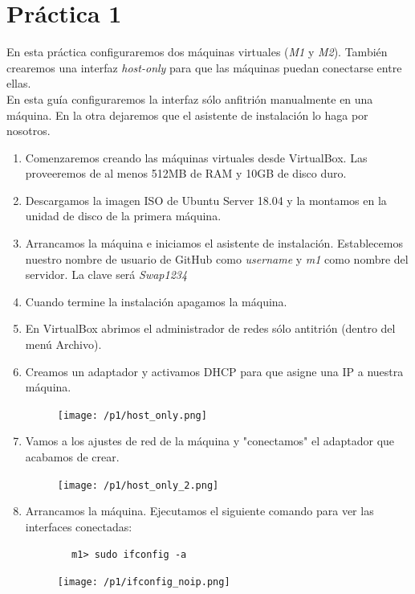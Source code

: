 \documentclass[12pt,spanish]{article}
\begin{document}
\section{Práctica 1}

En esta práctica configuraremos dos máquinas virtuales (\textit{M1} y \textit{M2}). También crearemos una interfaz \emph{host-only} para que las máquinas puedan conectarse entre ellas. \\

En esta guía configuraremos la interfaz sólo anfitrión manualmente en una máquina. En la otra dejaremos que el asistente de instalación lo haga por nosotros.

\begin{enumerate}
	\item Comenzaremos creando las máquinas virtuales desde VirtualBox. Las proveeremos de al menos 512MB de RAM y 10GB de disco duro.
	\item Descargamos la imagen ISO de Ubuntu Server 18.04 y la montamos en la unidad de disco de la primera máquina.
	\item Arrancamos la máquina e iniciamos el asistente de instalación. Establecemos nuestro nombre de usuario de GitHub como \emph{username} y \emph{m1} como nombre del servidor. La clave será \emph{Swap1234}
	\item Cuando termine la instalación apagamos la máquina.
	\item En VirtualBox abrimos el administrador de redes sólo antitrión (dentro del menú Archivo).
	\item Creamos un adaptador y activamos DHCP para que asigne una IP a nuestra máquina.
	\begin{figure}[H]
		\centering
		\texttt{[image: /p1/host\_only.png]}
	\end{figure}
	\item Vamos a los ajustes de red de la máquina y "conectamos" el adaptador que acabamos de crear.
	\begin{figure}[H]
		\centering
		\texttt{[image: /p1/host\_only\_2.png]}
	\end{figure}
	\item Arrancamos la máquina. Ejecutamos el siguiente comando para ver las interfaces conectadas:
	\begin{lstlisting}
		m1> sudo ifconfig -a
	\end{lstlisting}
	\begin{figure}[H]
		\centering
		\texttt{[image: /p1/ifconfig\_noip.png]}
	\end{figure}

\end{enumerate}
\end{document}
